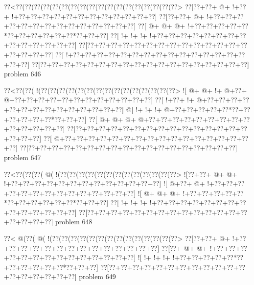 \vbox{\vbox{\goo
\0??<\0??(\0??(\0??(\0??(\0??(\0??(\0??(\0??(\0??(\0??(\0??(\0??(\0??(\0??(\0??(\0??(\0??(\0??>
\0??[\0??+\0??+\- @+\- !+\0??+\- !+\0??+\0??+\0??+\0??+\0??+\0??+\0??+\0??+\0??+\0??+\0??+\0??]
\0??[\0??+\0??+\- @+\- !+\0??+\0??+\0??+\0??+\0??+\0??+\0??+\0??+\0??+\0??+\0??+\0??+\0??+\0??]
\0??[\- @+\- @+\- @+\- !+\0??+\0??+\0??+\0??+\0??*\0??+\0??+\0??+\0??+\0??+\0??*\0??+\0??+\0??]
\0??[\- !+\- !+\- !+\- !+\0??+\0??+\0??+\0??+\0??+\0??+\0??+\0??+\0??+\0??+\0??+\0??+\0??+\0??]
\0??[\0??+\0??+\0??+\0??+\0??+\0??+\0??+\0??+\0??+\0??+\0??+\0??+\0??+\0??+\0??+\0??+\0??+\0??]
\0??[\- !+\0??+\0??+\0??+\0??+\0??+\0??+\0??+\0??+\0??+\0??+\0??+\0??+\0??+\0??+\0??+\0??+\0??]
\0??[\0??+\0??+\0??+\0??+\0??+\0??+\0??+\0??+\0??+\0??+\0??+\0??+\0??+\0??+\0??+\0??+\0??+\0??]
}
\hfil problem 646\hfil\break
}



\vbox{\vbox{\goo
\0??<\0??(\0??(\- !(\0??(\0??(\0??(\0??(\0??(\0??(\0??(\0??(\0??(\0??(\0??(\0??(\0??(\0??(\0??>
\- ![\- @+\- @+\- !+\- @+\0??+\- @+\0??+\0??+\0??+\0??+\0??+\0??+\0??+\0??+\0??+\0??+\0??+\0??]
\0??[\- !+\0??+\- !+\- @+\0??+\0??+\0??+\0??+\0??+\0??+\0??+\0??+\0??+\0??+\0??+\0??+\0??+\0??]
\- @[\- !+\- !+\- !+\- @+\0??+\0??+\0??+\0??+\0??*\0??+\0??+\0??+\0??+\0??+\0??*\0??+\0??+\0??]
\0??[\- @+\- @+\- @+\- @+\0??+\0??+\0??+\0??+\0??+\0??+\0??+\0??+\0??+\0??+\0??+\0??+\0??+\0??]
\0??[\0??+\0??+\0??+\0??+\0??+\0??+\0??+\0??+\0??+\0??+\0??+\0??+\0??+\0??+\0??+\0??+\0??+\0??]
\0??[\- @+\0??+\0??+\0??+\0??+\0??+\0??+\0??+\0??+\0??+\0??+\0??+\0??+\0??+\0??+\0??+\0??+\0??]
\0??[\0??+\0??+\0??+\0??+\0??+\0??+\0??+\0??+\0??+\0??+\0??+\0??+\0??+\0??+\0??+\0??+\0??+\0??]
}
\hfil problem 647\hfil\break
}



\vbox{\vbox{\goo
\0??<\0??(\0??(\0??(\- @(\- !(\0??(\0??(\0??(\0??(\0??(\0??(\0??(\0??(\0??(\0??(\0??(\0??(\0??>
\- ![\0??+\0??+\- @+\- @+\- !+\0??+\0??+\0??+\0??+\0??+\0??+\0??+\0??+\0??+\0??+\0??+\0??+\0??]
\- ![\- @+\0??+\- @+\- !+\0??+\0??+\0??+\0??+\0??+\0??+\0??+\0??+\0??+\0??+\0??+\0??+\0??+\0??]
\- ![\- @+\- @+\- @+\- !+\0??+\0??+\0??+\0??+\0??*\0??+\0??+\0??+\0??+\0??+\0??*\0??+\0??+\0??]
\0??[\- !+\- !+\- !+\- !+\0??+\0??+\0??+\0??+\0??+\0??+\0??+\0??+\0??+\0??+\0??+\0??+\0??+\0??]
\0??[\0??+\0??+\0??+\0??+\0??+\0??+\0??+\0??+\0??+\0??+\0??+\0??+\0??+\0??+\0??+\0??+\0??+\0??]
}
\hfil problem 648\hfil\break
}



\vbox{\vbox{\goo
\0??<\- @(\0??(\- @(\- !(\0??(\0??(\0??(\0??(\0??(\0??(\0??(\0??(\0??(\0??(\0??(\0??(\0??(\0??>
\0??[\0??+\0??+\- @+\- !+\0??+\0??+\0??+\0??+\0??+\0??+\0??+\0??+\0??+\0??+\0??+\0??+\0??+\0??]
\0??[\0??+\- @+\- @+\- !+\0??+\0??+\0??+\0??+\0??+\0??+\0??+\0??+\0??+\0??+\0??+\0??+\0??+\0??]
\- ![\- !+\- !+\- !+\- !+\0??+\0??+\0??+\0??+\0??*\0??+\0??+\0??+\0??+\0??+\0??*\0??+\0??+\0??]
\0??[\0??+\0??+\0??+\0??+\0??+\0??+\0??+\0??+\0??+\0??+\0??+\0??+\0??+\0??+\0??+\0??+\0??+\0??]
}
\hfil problem 649\hfil\break
}



